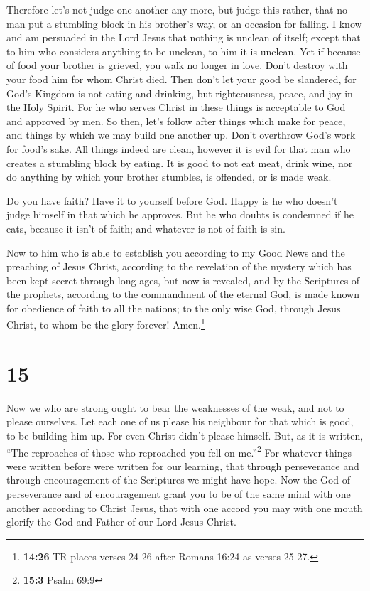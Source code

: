  Therefore let's not judge one another any more, but
judge this rather, that no man put a stumbling block in his brother's
way, or an occasion for falling.  I know and am persuaded
in the Lord Jesus that nothing is unclean of itself; except that to him
who considers anything to be unclean, to him it is unclean.
 Yet if because of food your brother is grieved, you walk
no longer in love. Don't destroy with your food him for whom Christ
died.  Then don't let your good be slandered,
 for God's Kingdom is not eating and drinking, but
righteousness, peace, and joy in the Holy Spirit.  For he
who serves Christ in these things is acceptable to God and approved by
men.  So then, let's follow after things which make for
peace, and things by which we may build one another up. 
Don't overthrow God's work for food's sake. All things indeed are clean,
however it is evil for that man who creates a stumbling block by eating.
 It is good to not eat meat, drink wine, nor do anything
by which your brother stumbles, is offended, or is made weak.

 Do you have faith? Have it to yourself before God. Happy
is he who doesn't judge himself in that which he approves.
 But he who doubts is condemned if he eats, because it
isn't of faith; and whatever is not of faith is sin.

 Now to him who is able to establish you according to my
Good News and the preaching of Jesus Christ, according to the revelation
of the mystery which has been kept secret through long ages,
 but now is revealed, and by the Scriptures of the
prophets, according to the commandment of the eternal God, is made known
for obedience of faith to all the nations;  to the only
wise God, through Jesus Christ, to whom be the glory forever!
Amen.\footnote{\textbf{14:26} TR places verses 24-26 after Romans 16:24
  as verses 25-27.}

\hypertarget{section-14}{%
\section{15}\label{section-14}}

 Now we who are strong ought to bear the weaknesses of the
weak, and not to please ourselves.  Let each one of us
please his neighbour for that which is good, to be building him up.
 For even Christ didn't please himself. But, as it is
written, ``The reproaches of those who reproached you fell on
me.''\footnote{\textbf{15:3} Psalm 69:9}  For whatever
things were written before were written for our learning, that through
perseverance and through encouragement of the Scriptures we might have
hope.  Now the God of perseverance and of encouragement
grant you to be of the same mind with one another according to Christ
Jesus,  that with one accord you may with one mouth
glorify the God and Father of our Lord Jesus Christ.

